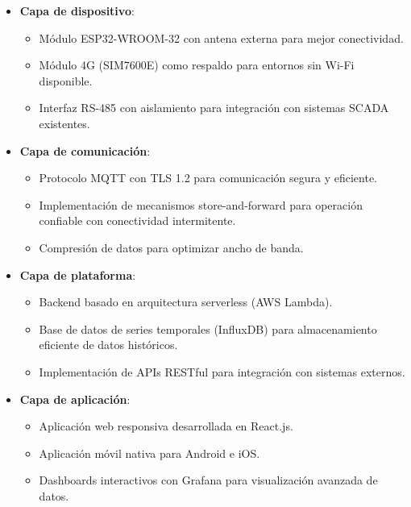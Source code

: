 \documentclass{report}          %
\begin{document}
                \begin{itemize}
                    \item \textbf{Capa de dispositivo}:
                    \begin{itemize}
                        \item Módulo ESP32-WROOM-32 con antena externa para mejor conectividad.
                        \item Módulo 4G (SIM7600E) como respaldo para entornos sin Wi-Fi disponible.
                        \item Interfaz RS-485 con aislamiento para integración con sistemas SCADA existentes.
                    \end{itemize}
                    
                    \item \textbf{Capa de comunicación}:
                    \begin{itemize}
                        \item Protocolo MQTT con TLS 1.2 para comunicación segura y eficiente.
                        \item Implementación de mecanismos store-and-forward para operación confiable con conectividad intermitente.
                        \item Compresión de datos para optimizar ancho de banda.
                    \end{itemize}
                    
                    \item \textbf{Capa de plataforma}:
                    \begin{itemize}
                        \item Backend basado en arquitectura serverless (AWS Lambda).
                        \item Base de datos de series temporales (InfluxDB) para almacenamiento eficiente de datos históricos.
                        \item Implementación de APIs RESTful para integración con sistemas externos.
                    \end{itemize}
                    
                    \item \textbf{Capa de aplicación}:
                    \begin{itemize}
                        \item Aplicación web responsiva desarrollada en React.js.
                        \item Aplicación móvil nativa para Android e iOS.
                        \item Dashboards interactivos con Grafana para visualización avanzada de datos.
                    \end{itemize}
                \end{itemize}
\end{document}
